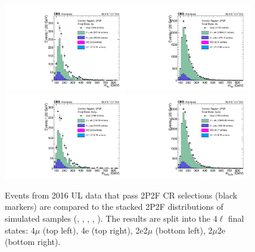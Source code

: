 \begin{figure}[!htbp]
	\begin{center}
		\includegraphics[width=0.48\textwidth]{figures/higgsmassmeas/redbkg/cr/UL2016_CR_2P2F_4mu.pdf}
		\includegraphics[width=0.48\textwidth]{figures/higgsmassmeas/redbkg/cr/UL2016_CR_2P2F_4e.pdf}
		\includegraphics[width=0.48\textwidth]{figures/higgsmassmeas/redbkg/cr/UL2016_CR_2P2F_2e2mu.pdf}
		\includegraphics[width=0.48\textwidth]{figures/higgsmassmeas/redbkg/cr/UL2016_CR_2P2F_2mu2e.pdf}
		\caption{
			Events from 2016 UL data that pass 2P2F CR selections (black markers) 
			are compared to the stacked 2P2F distributions of simulated samples
			(\Zplusjets, \ttbarplusjets, \WZ, \Zgammastar, \ZZ).
			The results are split into the $4\ell$ final states:
            $4\mu$ (top left), 4e (top right), 2e2$\mu$ (bottom left), 2$\mu$2e (bottom right).
        }
		\label{cr_plots_2p2f_2016}
	\end{center}
\end{figure}
